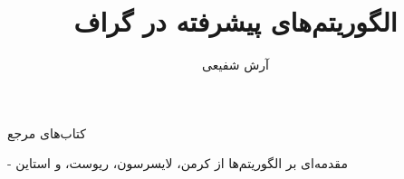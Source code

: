 \documentclass[aspectratio=169]{beamer}
\title{الگوریتم‌های پیشرفته در گراف}
\author{آرش شفیعی}
\institute{\texttt{[image: logos/ui.png]}}
\date{}
\begin{document}
\begin{frame}[plain]
	\maketitle
\end{frame}

\setcounter{framenumber}{0}
\raggedleft

\begin{itemframe}{کتاب‌های مرجع}{}
\itmsep{5mm}
\item[-]
مقدمه‌ای بر الگوریتم‌ها از کرمن، لایسرسون، ریوست، و استاین

\end{itemframe}



\end{document}
